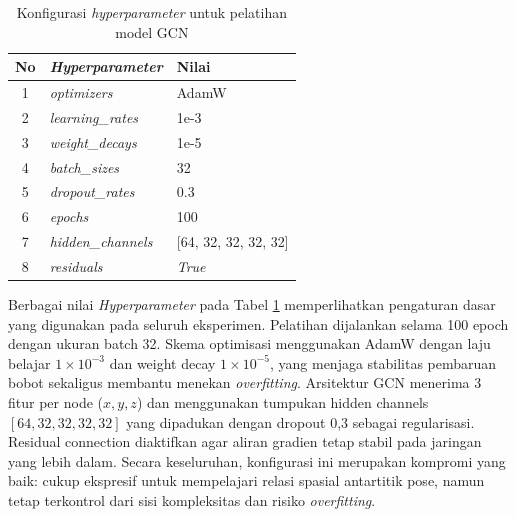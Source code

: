 \begin{table}[htbp]
    \centering
    \caption{Konfigurasi \textit{hyperparameter} untuk pelatihan model GCN}
    \label{tab:hyperparams-gcn}
    \begin{tabular}{|c|l|l|}
        \hline
        \textbf{No} & \textbf{\textit{Hyperparameter}} & \textbf{Nilai} \\ \hline
        1 & \textit{optimizers}          & AdamW \\ \hline
        2 & \textit{learning\_rates}     & 1e-3 \\ \hline
        3 & \textit{weight\_decays}      & 1e-5 \\ \hline
        4 & \textit{batch\_sizes}        & 32 \\ \hline
        5 & \textit{dropout\_rates}      & 0.3 \\ \hline
        6 & \textit{epochs}              & 100 \\ \hline
        7 & \textit{hidden\_channels}    & [64, 32, 32, 32, 32] \\ \hline
        8 & \textit{residuals}           & \textit{True} \\ \hline
    \end{tabular}
\end{table}


Berbagai nilai \textit{Hyperparameter} pada Tabel \ref{tab:hyperparams-gcn} memperlihatkan pengaturan dasar yang digunakan pada seluruh eksperimen. Pelatihan dijalankan selama 100 epoch dengan ukuran batch 32. Skema optimisasi menggunakan AdamW dengan laju belajar \(1\times 10^{-3}\) dan weight decay \(1\times 10^{-5}\), yang menjaga stabilitas pembaruan bobot sekaligus membantu menekan \textit{overfitting}. Arsitektur GCN menerima 3 fitur per node (\(x,y,z\)) dan menggunakan tumpukan hidden channels \([64, 32, 32, 32, 32]\) yang dipadukan dengan dropout 0,3 sebagai regularisasi. Residual connection diaktifkan agar aliran gradien tetap stabil pada jaringan yang lebih dalam. Secara keseluruhan, konfigurasi ini merupakan kompromi yang baik: cukup ekspresif untuk mempelajari relasi spasial antartitik pose, namun tetap terkontrol dari sisi kompleksitas dan risiko \textit{overfitting}. \par

